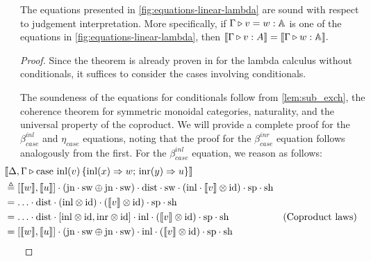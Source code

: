 \begin{theorem} \label{thm:soundness_classical}
The equations presented in \autoref{fig:equations-linear-lambda} are sound with respect to judgement interpretation. 
More specifically, if \(\Gamma \triangleright v = w : \mathbb{A}\) is one of the equations in \autoref{fig:equations-linear-lambda}, then 
$\llbracket \Gamma \triangleright v : A  \rrbracket = \llbracket  \Gamma \triangleright w : \mathbb{A}\rrbracket.$
\end{theorem}

\begin{proof}
  Since the theorem is already proven in \cite[Theorem 2.3]{dahlqvist2023syntactic} for the lambda calculus without conditionals, it suffices to consider the cases involving conditionals. 
  
  The soundeness of the equations for conditionals follow from \autoref{lem:sub_exch}, the coherence theorem for symmetric monoidal categories, naturality, and the universal property of the coproduct.   
  We will provide a complete proof for the $\beta_{case}^{inl}$ and $\eta_{case}$ equations, noting that the proof for the $\beta_{case}^{inr}$ equation follows analogously from the first. For the $\beta_{case}^{inl}$ equation, we reason as follows:
  \begin{align*}
    & \hspace{-30pt}  \llbracket \Delta,\Gamma \vljud  \text{case }  \text{inl}(v)\, \{\text{inl} (x) \Rightarrow w ;\, \text{inr} (y) \Rightarrow u\} \rrbracket \\
    & \hspace{-30pt}  \triangleq  [\llbracket w\rrbracket,\llbracket u \rrbracket] \comp (\text{jn} \comp \sw \oplus \text{jn} \comp \sw  ) \comp \dist \comp \sw \comp (\inl \comp \llbracket  v \rrbracket \otimes \id) \comp \text{sp} \comp \text{sh} \\
    & \hspace{-30pt} =  \ldots \comp \dist \comp (\inl \otimes \id  ) \comp ( \llbracket  v \rrbracket \otimes \id) \comp \text{sp} \comp \text{sh}  \\
    & \hspace{-30pt} =  \ldots \comp \dist \comp [\inl \otimes \id, \inr \otimes \id] \comp \inl  \comp ( \llbracket  v \rrbracket \otimes \id) \comp \text{sp} \comp \text{sh}  &(\text{Coproduct laws})\\
    & \hspace{-30pt} =  [\llbracket w\rrbracket,\llbracket u \rrbracket] \comp (\text{jn} \comp \sw \oplus \text{jn} \comp \sw )  \comp \inl  \comp ( \llbracket  v \rrbracket \otimes \id) \comp \text{sp} \comp \text{sh} \\

\end{align*}
\end{proof}
